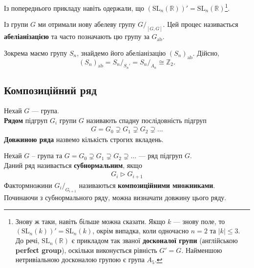 \documentclass{math_library}
\begin{document}
\begin{example}
Із попереднього прикладу навіть одержали, що $(\mathrm{SL}_n(\mathbb{R}))' = \mathrm{SL}_n(\mathbb{R})$\footnote{Знову ж таки, навіть більше можна сказати. Якщо $k$ --- знову поле, то $(\mathrm{SL}_n(k))' = \mathrm{SL}_n(k)$, окрім випадка, коли одночасно $n = 2$ та $|k| \leq 3$. До речі, $\mathrm{SL}_n(\mathbb{R})$ є прикладом так званої \textbf{досконалої групи} (англійською \textbf{perfeсt group}), оскільки виконується рівність $G' = G$. Найменшою нетривіальною досконалою групою є група $A_5$.}.
\end{example}

\begin{remark}
Із групи $G$ ми отримали нову абелеву групу $G/_{[G,G]}$. Цей процес називається \textbf{абеліанізацією} та часто позначають цю групу за $G_{\text{ab}}$.
\end{remark}

\begin{example}
Зокрема маємо групу $S_n$, знайдемо його абеліанізацію $(S_n)_{\text{ab}}$. Дійсно,
\[
(S_n)_{\text{ab}} = {S_n}/_{S_n'} = {S_n}/_{A_n} \cong \mathbb{Z}_2.
\]
\end{example}

\subsection{Композиційний ряд}
\begin{definition}
Нехай $G$ --- група.\\
\textbf{Рядом} підгруп $G_i$ групи $G$ називають спадну послідовність підгруп
\begin{align*}
G = G_0 \supsetneq G_1 \supsetneq G_2 \supsetneq \dots
\end{align*}
\textbf{Довжиною ряда} назвемо кількість строгих вкладень.
\end{definition}

\begin{definition}
Нехай $G$ -- група та $G = G_0 \supsetneq G_1 \supsetneq G_2 \supsetneq \dots$ --- ряд підгруп $G$.\\
Даний ряд називається \textbf{субнормальним}, якщо
\begin{align*}
G_i \triangleright G_{i+1}
\end{align*}
Фактормножини ${G_i}/_{G_{i+1}}$ називаються \textbf{композиційними множниками}.\\
Починаючи з субнормального ряду, можна визначати довжину цього ряду.
\end{definition}
\end{document}
